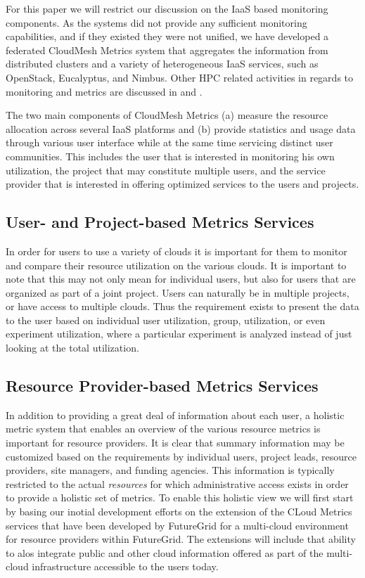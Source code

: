 \documentclass{tex/sig-alternate}
\begin{document}
{For this paper we will restrict our discussion on the IaaS based
monitoring components. As the systems did not provide any sufficient
monitoring capabilities, and if they existed they were not unified, we
have developed a federated CloudMesh Metrics system that aggregates
the information from distributed clusters and a variety of
heterogeneous IaaS services, such as OpenStack, Eucalyptus, and
Nimbus. Other HPC related activities in regards to monitoring and
metrics are discussed in \cite{ubmod}
and \cite{las12xdmod-kernel,las12xdmod-planing,las13xdmod}.


The two main components of CloudMesh Metrics (a) measure the resource
allocation across several IaaS platforms and (b) provide statistics
and usage data through various user interface while at the same time
servicing distinct user communities. This includes the user that is
interested in monitoring his own utilization, the project that may
constitute multiple users, and the service provider that is interested
in offering optimized services to the users and projects.

\subsection{User- and Project-based Metrics Services}

In order for users to use a variety of clouds it is important for them
to monitor and compare their resource utilization on the various
clouds. It is important to note that this may not only mean for
individual users, but also for users that are organized as part of a
joint project. Users can naturally be in multiple projects, or have
access to multiple clouds. Thus the requirement exists to present the
data to the user based on individual user utilization, group,
utilization, or even experiment utilization, where a particular
experiment is analyzed instead of just looking at the total
utilization.

\subsection{Resource Provider-based Metrics Services}

In addition to providing a great deal of information about each user,
a holistic metric system that enables an overview of the various
resource metrics is important for resource providers. It is clear that
summary information may be customized based on the requirements by
individual users, project leads, resource providers, site managers,
and funding agencies. This information is typically restricted to the
actual {\em resources} for which administrative access exists in order
to provide a holistic set of metrics.
To enable this holistic view we will first start by basing our inotial
development efforts on the extension of the CLoud Metrics services
that have been developed by FutureGrid for a multi-cloud environment
for resource providers within FutureGrid.
The extensions will include that ability to alos integrate public and other cloud
information offered as part of the multi-cloud infrastructure
accessible to the users today.

}
\end{document}
